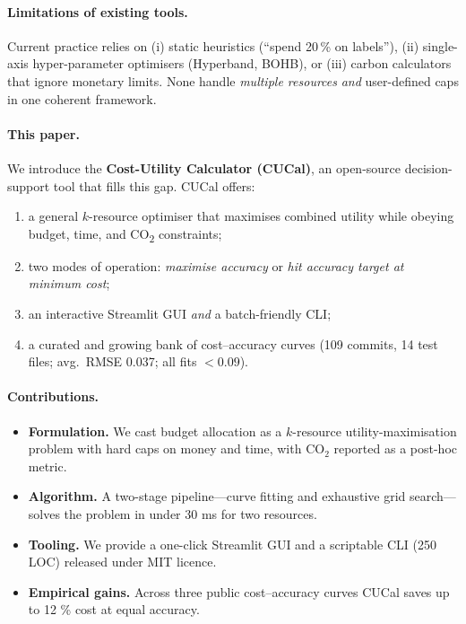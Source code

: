 \documentclass[11pt]{article}
\begin{document}
\paragraph{Limitations of existing tools.}
Current practice relies on
(i) static heuristics (“spend 20\,\% on labels”),
(ii) single-axis hyper-parameter optimisers (Hyperband, BOHB), or
(iii) carbon calculators that ignore monetary limits.
None handle \emph{multiple resources} \emph{and} user-defined caps in
one coherent framework.

\paragraph{This paper.}
We introduce the \textbf{Cost-Utility Calculator (CUCal)}, an
open-source decision-support tool that fills this gap.
CUCal offers:
\begin{enumerate}
  \item a general \(k\)-resource optimiser that maximises combined
        utility while obeying budget, time, and
        \mbox{CO\textsubscript{2}} constraints;
  \item two modes of operation: \emph{maximise accuracy} or
        \emph{hit accuracy target at minimum cost};
  \item an interactive Streamlit GUI \emph{and} a batch-friendly CLI;
  \item a curated and growing bank of cost–accuracy curves
        (109 commits, 14 test files; avg.\ RMSE 0.037; all fits \(< 0.09\)).
\end{enumerate}

\paragraph{Contributions.}
\begin{itemize}
  \item \textbf{Formulation.}  We cast budget allocation as a
        $k$-resource utility-maximisation problem with hard caps on
        money and time, with CO$_2$ reported as a post-hoc metric.
  \item \textbf{Algorithm.}  A two-stage pipeline—curve fitting and
        exhaustive grid search—solves the problem in under 30 ms for
        two resources.
  \item \textbf{Tooling.}  We provide a one-click Streamlit GUI and a
        scriptable CLI (250 LOC) released under MIT licence.
  \item \textbf{Empirical gains.}  Across three public
        cost–accuracy curves CUCal saves up to 12 \% cost at equal
        accuracy.
\end{itemize}
\end{document}
